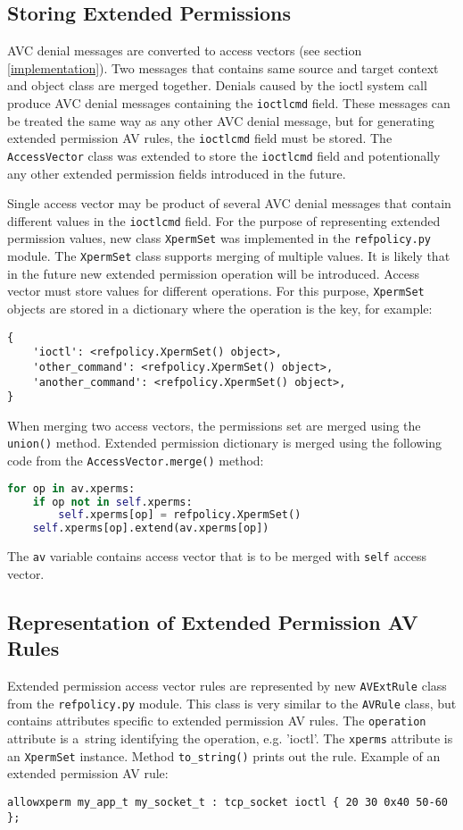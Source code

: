\subsection{Storing Extended Permissions}
AVC denial messages are converted to access vectors (see section
\ref{implementation}). Two messages that contains same source and target context
and object class are merged together. Denials caused by the ioctl system call
produce AVC denial messages containing the \texttt{ioctlcmd} field. These
messages can be treated the same way as any other AVC denial message, but for
generating extended permission AV rules, the \texttt{ioctlcmd} field must be
stored. The \texttt{AccessVector} class was extended to store the
\texttt{ioctlcmd} field and potentionally any other extended permission fields
introduced in the future.

Single access vector may be product of several AVC denial messages that contain
different values in the \texttt{ioctlcmd} field. For the purpose of representing
extended permission values, new class \texttt{XpermSet} was implemented in the
\texttt{refpolicy.py} module. The \texttt{XpermSet} class supports merging of
multiple values. It is likely that in the future new extended permission
operation will be introduced. Access vector must store values for different
operations. For this purpose, \texttt{XpermSet} objects are stored in a
dictionary where the operation is the key, for example:
\begin{lstlisting}
{
    'ioctl': <refpolicy.XpermSet() object>,
    'other_command': <refpolicy.XpermSet() object>,
    'another_command': <refpolicy.XpermSet() object>,
}
\end{lstlisting}

When merging two access vectors, the permissions set are merged using the
\texttt{union()} method. Extended permission dictionary is merged using the
following code from the \texttt{AccessVector.merge()} method:
\begin{lstlisting}[language=Python]
for op in av.xperms:
    if op not in self.xperms:
        self.xperms[op] = refpolicy.XpermSet()
    self.xperms[op].extend(av.xperms[op])
\end{lstlisting}
The \texttt{av} variable contains access vector that is to be merged with
\texttt{self} access vector.

\subsection{Representation of Extended Permission AV Rules}
Extended permission access vector rules are represented by new
\texttt{AVExtRule} class from the \texttt{refpolicy.py} module. This class is
very similar to the \texttt{AVRule} class, but contains attributes specific to
extended permission AV rules. The \texttt{operation} attribute is a~string
identifying the operation, e.g. 'ioctl'. The \texttt{xperms} attribute is an
\texttt{XpermSet} instance. Method \texttt{to\_string()} prints out the rule.
Example of an extended permission AV rule:
\begin{lstlisting}
allowxperm my_app_t my_socket_t : tcp_socket ioctl { 20 30 0x40 50-60 };
\end{lstlisting}

